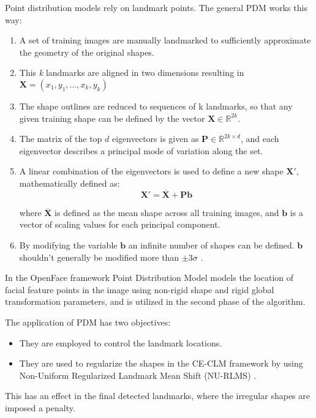 Point distribution models rely on landmark points. The general PDM works this way:
\begin{enumerate}
	\item A set of training images are manually landmarked to sufficiently approximate the geometry of the original shapes. 
	\item This \textit{k} landmarks are aligned in two dimensions resulting in \\
	$\mathbf{X} = (x_1,y_1, \dots, x_k, y_k)$
	\item The shape outlines are reduced to sequences of k landmarks, so that any given training shape can be defined by the vector $\mathbf{X} \in {\mathbb{R} ^{2k}}$.
	\item The matrix of the top $d$ eigenvectors is given as $\mathbf{P} \in \mathbb{R}^{2k \times d}$, and each eigenvector describes a principal mode of variation along the set.
	\item A linear combination of the eigenvectors is used to define a new shape $ \mathbf{X} '$, mathematically defined as: 
		\begin{equation}
			\mathbf {X}' = {\overline {\mathbf {X}} + \mathbf{P} \mathbf{b}}
		\end{equation}
		
	where $ {\overline {\mathbf {X}}}$ is defined as the mean shape across all training images, and $\mathbf {b}$ is a vector of scaling values for each principal component. 
	\item By modifying the variable $\mathbf {b}$  an infinite number of shapes can be defined. $\mathbf {b}$ shouldn't generally be modified more than $\pm3\sigma$ \cite{wiki:PDM}.
\end{enumerate}

In the OpenFace framework Point Distribution Model \cite{PDM_RLMS} models the location of facial feature points in the image using non-rigid shape and rigid global transformation parameters, and is utilized in the second phase of the algorithm.

The application of PDM has two objectives:

\begin{itemize}
	\item They are employed to control the landmark locations.
	\item They are used to regularize the shapes in the CE-CLM framework by using Non-Uniform Regularized Landmark Mean Shift (NU-RLMS) \cite{Baltru2013}.
\end{itemize}
This has an effect in the final detected landmarks, where the irregular shapes are imposed a penalty.

